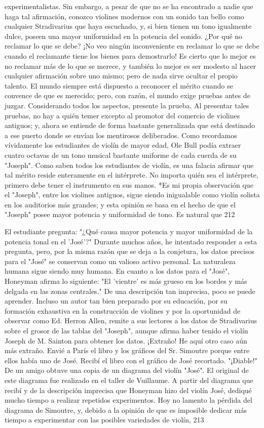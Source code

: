 experimentalistas. Sin embargo, a pesar de que no se ha encontrado a nadie que haga tal afirmación, conozco violines modernos con un sonido tan bello como cualquier Stradivarius que haya escuchado, y, si bien tienen un tono igualmente dulce, poseen una mayor uniformidad en la potencia del sonido.
¿Por qué no reclamar lo que se debe?
¡No veo ningún inconveniente en reclamar lo que se debe cuando el reclamante tiene los bienes para demostrarlo!
Es cierto que lo mejor es no reclamar más de lo que se merece, y también lo mejor es ser modesto al hacer cualquier afirmación sobre uno mismo; pero de nada sirve ocultar el propio talento. El mundo siempre está dispuesto a reconocer el mérito cuando se convence de que es merecido; pero, con razón, el mundo exige pruebas antes de juzgar.
Considerando todos los aspectos, presente la prueba.
Al presentar tales pruebas, no hay a quién temer excepto al promotor del comercio de violines antiguos; y, ahora se entiende de forma bastante generalizada que está destinado a ese puerto donde se envían los mentirosos deliberados.
Como recordamos vívidamente los estudiantes de violín de mayor edad, Ole Bull podía extraer cuatro octavas de un tono musical bastante uniforme de cada cuerda de su "Joseph". Como saben todos los estudiantes de violín, es una falacia afirmar que tal mérito reside enteramente en el intérprete. No importa quién sea el intérprete, primero debe tener el instrumento en sus manos. *Es mi propia observación que el "Joseph", entre los violines antiguos, sigue siendo inigualable como violín solista en los auditorios más grandes; y esta opinión se basa en el hecho de que el "Joseph" posee mayor potencia y uniformidad de tono. Es natural que
212

El estudiante pregunta: "¿Qué causa mayor potencia y mayor uniformidad de la potencia tonal en el 'José'?" Durante muchos años, he intentado responder a esta pregunta, pero, por la misma razón que se deja a la conjetura, los datos precisos para el "José" se conservan como un valioso activo personal. La naturaleza humana sigue siendo muy humana. En cuanto a los datos para el "José",
Honeyman afirma lo siguiente: "El 'vientre' es más grueso
en los bordes y más delgada en las zonas centrales." De una descripción tan imprecisa, poco se puede aprender. Incluso un autor tan bien preparado por su educación, por su formación exhaustiva en la construcción de violines y por la oportunidad de observar como Ed. Herron Allen, remite a sus lectores a los datos de Stradivarius sobre el grosor de las tablas del "Joseph", aunque afirma haber tenido el violín Joseph de M. Sainton para obtener los datos.
¡Extraño!
He aquí otro caso aún más extraño. Envié a París el libro y los gráficos del Sr. Simoutre porque entre ellos había uno de José. Recibí el libro con el gráfico de José recortado.
"¡Diable!"
De un amigo obtuve una copia de un diagrama del violín "José". El original de este diagrama fue realizado en el taller de Vuillaume. A partir del diagrama que recibí y de la descripción imprecisa que Honeyman hizo del violín José, dediqué mucho tiempo a realizar repetidos experimentos. Hoy no lamento la pérdida del diagrama de Simoutre, y, debido a la opinión de que es imposible dedicar más tiempo a experimentar con las posibles variedades de violín,
213

